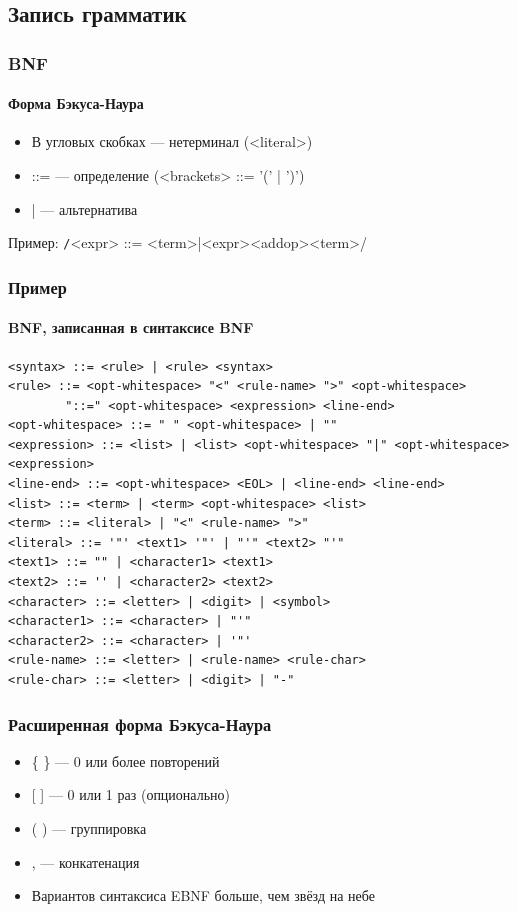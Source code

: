 \documentclass{../../slides-style}
\begin{document}
    \subsection{Запись грамматик}

    \begin{frame}
        \frametitle{BNF}
        \framesubtitle{Форма Бэкуса-Наура}
        \begin{itemize}
            \item В угловых скобках --- нетерминал (<literal>)
            \item ::= --- определение (<brackets> ::= '(' | ')')
            \item | --- альтернатива
        \end{itemize}
        Пример: \texttt/<expr> ::= <term>|<expr><addop><term>/
    \end{frame}

    \begin{frame}[fragile]
        \frametitle{Пример}
        \framesubtitle{BNF, записанная в синтаксисе BNF}
        \begin{footnotesize}
            \begin{verbatim}
<syntax> ::= <rule> | <rule> <syntax>
<rule> ::= <opt-whitespace> "<" <rule-name> ">" <opt-whitespace> 
        "::=" <opt-whitespace> <expression> <line-end>
<opt-whitespace> ::= " " <opt-whitespace> | ""
<expression> ::= <list> | <list> <opt-whitespace> "|" <opt-whitespace> <expression>
<line-end> ::= <opt-whitespace> <EOL> | <line-end> <line-end>
<list> ::= <term> | <term> <opt-whitespace> <list>
<term> ::= <literal> | "<" <rule-name> ">"
<literal> ::= '"' <text1> '"' | "'" <text2> "'"
<text1> ::= "" | <character1> <text1>
<text2> ::= '' | <character2> <text2>
<character> ::= <letter> | <digit> | <symbol>
<character1> ::= <character> | "'"
<character2> ::= <character> | '"'
<rule-name> ::= <letter> | <rule-name> <rule-char>
<rule-char> ::= <letter> | <digit> | "-"
            \end{verbatim}
        \end{footnotesize}
    \end{frame}

    \begin{frame}
        \frametitle{Расширенная форма Бэкуса-Наура}
        \begin{itemize}
            \item \{ \} --- 0 или более повторений
            \item {[ ]} --- 0 или 1 раз (опционально)
            \item ( ) --- группировка
            \item , --- конкатенация
            \item Вариантов синтаксиса EBNF больше, чем звёзд на небе
        \end{itemize}
    \end{frame}
\end{document}
